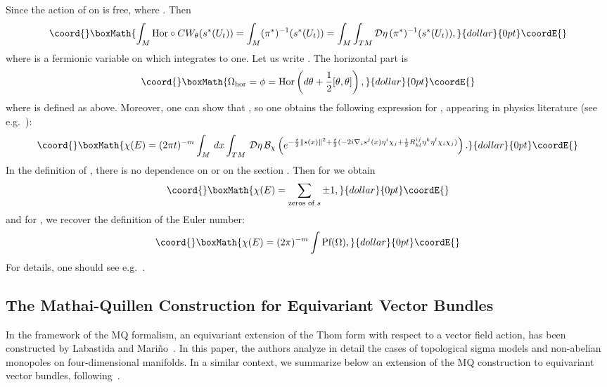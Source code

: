 \documentclass[a4paper,12pt,reqno,sumlimits]{amsart}
\theoremstyle{plain}
\theoremstyle{definition}
\providecommand{\1}{{\bf 1}}
\providecommand{\ex}[1]{{e^{#1}}}
\providecommand{\calB}{{\mathcal B}}
\providecommand{\calD}{{\mathcal D}}
\renewcommand{\to}{\longrightarrow}
\providecommand{\inv}{^{-1}}
\providecommand{\norm}[1]{\| #1 \|}
\numberwithin{equation}{section}
\begin{document}
Since the action of \coordHE{} on \coordHE{} is free, \myHighlight{$\text{Hor}\circ
CW_{\theta}=(\pi^*)\inv,$}\coordHE{} where \myHighlight{$P\stackrel{\pi}{\to}P/G=M$}\coordHE{}.  Then
$$\coord{}\boxMath{
\int_M\text{Hor}\circ CW_{\theta}(s^*(U_t)) = \int_M(\pi^*)\inv(s^*(U_t))
=\int_M\int_{TM}\calD\eta\, (\pi^*)\inv(s^*(U_t)),
}{dollar}{0pt}\coordE{}$$
where \myHighlight{$\eta$}\coordHE{} is a fermionic variable on \coordHE{} which integrates to one.  Let
us write \coordHE{}. The horizontal part is
$$\coord{}\boxMath{
\Omega_{\text{hor}}=\phi=\text{Hor}\left(d\theta+\frac{1}{2}[\theta,\theta]\right),
}{dollar}{0pt}\coordE{}$$
where \myHighlight{$\phi$}\coordHE{} is defined as above. Moreover, one can show that
\coordHE{},
so one obtains the following expression for \coordHE{}, appearing in physics
literature (see e.g.~\cite{labastida_marino1}):
$$\coord{}\boxMath{
\chi(E)=(2\pi t)^{-m}\int_M\,dx\int_{TM}\,\calD\eta\,\calB_\chi\left(
  \ex{-\frac{t}{2}\norm{s(x)}^2 
    +\frac{t}{2}(-2i\nabla_i s^j(x)\eta^i\chi_j+
    \frac{1}{2}R^{ij}_{kl}\eta^k\eta^l\chi_i\chi_j)}\right).
}{dollar}{0pt}\coordE{}$$
In the definition of \coordHE{}, there is no dependence on \coordHE{} or on the
section \coordHE{}. Then for \myHighlight{$t\to\infty$}\coordHE{} we obtain
$$\coord{}\boxMath{
\chi(E)=\sum_{\text{zeros of }s}\pm 1,
}{dollar}{0pt}\coordE{}$$
and for \myHighlight{$t\to 0$}\coordHE{}, we recover the definition of the Euler number:
$$\coord{}\boxMath{
\chi(E)=(2\pi)^{-m}\int\text{Pf}(\Omega),
}{dollar}{0pt}\coordE{}$$
For details, one should see e.g.~\cite[p. 111]{cordes}.



\subsection{The Mathai-Quillen Construction for Equivariant Vector Bundles}
\label{mqeqvb}

In the framework of the MQ formalism, an equivariant extension of the Thom
form with respect to a vector field action, has been constructed by Labastida
and Mari\~no~\cite{labastida_marino2}. In this paper, the authors analyze in
detail the cases of topological sigma models and non-abelian monopoles on
four-dimensional manifolds.  In a similar context, we summarize below an
extension of the MQ construction to equivariant vector bundles,
following~\cite[Secs. 2.3, 2.6]{radu}.
\end{document}
